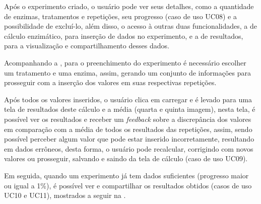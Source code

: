 Após o experimento criado, o usuário pode ver seus detalhes, como a quantidade de enzimas, tratamentos e repetições, seu progresso (caso de uso UC08) e a possibilidade de excluí-lo, além disso, o acesso à outras duas funcionalidades, a de cálculo enzimático, para inserção de dados no experimento, e a de resultados, para a visualização e compartilhamento desses dados.

Acompanhando a , para o preenchimento do experimento é necessário escolher um tratamento e uma enzima, assim, gerando um conjunto de informações para prosseguir com a inserção dos valores em suas respectivas repetições.

Após todos os valores inseridos, o usuário clica em carregar e é levado para uma tela de resultados deste cálculo e a média (quarta e quinta imagem), nesta tela, é possível ver os resultados e receber um \textit{feedback} sobre a discrepância dos valores em comparação com a média de todos os resultados das repetições, assim, sendo possível perceber algum valor que pode estar inserido incorretamente, resultando em dados errôneos, desta forma, o usuário pode recalcular, corrigindo com novos valores ou prosseguir, salvando e saindo da tela de cálculo (caso de uso UC09).

Em seguida, quando um experimento já tem dados suficientes (progresso maior ou igual a 1\%), é possível ver e compartilhar os resultados obtidos (casos de uso UC10 e UC11), mostrados a seguir na .

